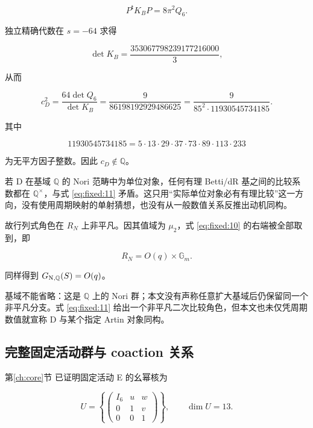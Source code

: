 \documentclass[11pt,a4paper,oneside]{ctexart}
\theoremstyle{cnplain}
\theoremstyle{definition}
\theoremstyle{remark}
\numberwithin{equation}{section}
\begin{document}
\begin{equation}
P^{\mathsf t}K_BP=8\pi^2Q_6.
\end{equation}

独立精确代数在 \(s=- 64\) 求得

\begin{equation}
\det K_B=\frac{353067798239177216000}{3},
\end{equation}

从而

\begin{equation}
\boxed{c_D^2=\frac{64\det Q_6}{\det K_B}
        =\frac9{86198192929486625}
        =\frac9{85^2\cdot11930545734185}.}                        \label{eq:fixed:11}
\end{equation}

其中

\begin{equation}
11930545734185=5\cdot13\cdot29\cdot37\cdot73\cdot89\cdot113\cdot233
\end{equation}

为无平方因子整数。因此 \(c_D\notin\mathbb Q\)。

若 D 在基域 \(\mathbb Q\) 的 Nori 范畴中为单位对象，任何有理 Betti/dR 基之间的比较系数都在 \(\mathbb Q^\times\)，与式 \eqref{eq:fixed:11} 矛盾。这只用``实际单位对象必有有理比较''这一方向，没有使用周期映射的单射猜想，也没有从一般数值关系反推出动机同构。

故行列式角色在 \(R_N\) 上非平凡。因其值域为 \(\mu_2\)，式 \eqref{eq:fixed:10} 的右端被全部取到，即

\begin{equation}
R_N=O(q)\times\mathbb G_m.              \label{eq:fixed:12}
\end{equation}

同样得到 \(G_{\rm N,\mathbb Q}(S)=O(q)\)。

基域不能省略：这是 \(\mathbb Q\) 上的 Nori 群；本文没有声称任意扩大基域后仍保留同一个非平凡分支。式 \eqref{eq:fixed:11} 给出一个非平凡二次比较角色，但本文也未仅凭周期数值就宣称 D 与某个指定 Artin 对象同构。


\subsection{完整固定活动群与 coaction 关系}\label{sec:fixed:7}

第\ref{ch:core}节 已证明固定活动 E 的幺幂核为

\begin{equation}
U=\left\{\begin{pmatrix}I_6&u&w\\0&1&v\\0&0&1\end{pmatrix}\right\},
 \qquad \dim U=13.
\end{equation}
\end{document}
